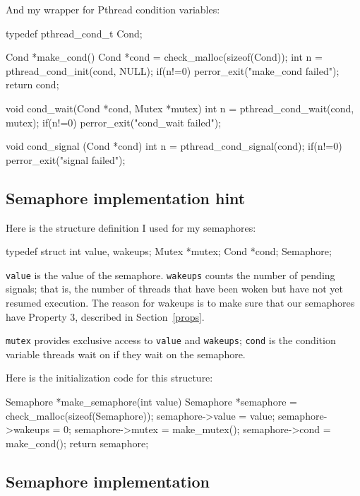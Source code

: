 \documentclass{book}
\begin{document}
And my wrapper for Pthread condition variables:

\begin{unbreakable}[]{}
typedef pthread_cond_t Cond;

Cond *make_cond() {
 Cond *cond = check_malloc(sizeof(Cond)); 
 int n = pthread_cond_init(cond, NULL);
 if(n!=0) perror_exit("make_cond failed");
 return cond;
}

void cond_wait(Cond *cond, Mutex *mutex) {
 int n = pthread_cond_wait(cond, mutex);
 if(n!=0) perror_exit("cond_wait failed");
}

void cond_signal (Cond *cond) {
 int n = pthread_cond_signal(cond);
 if(n!=0) perror_exit("signal failed");
}
\end{unbreakable}




\subsection{Semaphore implementation hint}

Here is the structure definition I used for my semaphores:


\begin{unbreakable}[]{}
typedef struct {
  int value, wakeups;
  Mutex *mutex;
  Cond *cond;
} Semaphore;
\end{unbreakable}

{\tt value} is the value of the semaphore.  {\tt wakeups} counts
the number of pending signals; that is, the number of threads
that have been woken but have not yet resumed execution.  The reason
for wakeups is to make sure that our semaphores have
Property 3, described in Section~\ref{props}.

{\tt mutex} provides exclusive access to {\tt value} and
    {\tt wakeups}; {\tt cond} is the condition variable threads
wait on if they wait on the semaphore.

Here is the initialization code for this structure:

\pagebreak
\begin{unbreakable}[]{}
Semaphore *make_semaphore(int value) {
 Semaphore *semaphore = 
  check_malloc(sizeof(Semaphore));
 semaphore->value = value;
 semaphore->wakeups = 0;
 semaphore->mutex = make_mutex();
 semaphore->cond = make_cond();
 return semaphore;
}
\end{unbreakable}



\subsection{Semaphore implementation}
\end{document}
